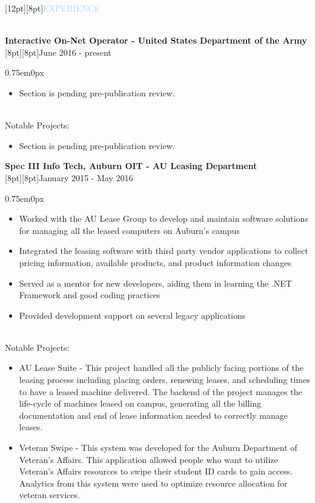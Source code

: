 \documentclass[12pt]{res}
\newenvironment{ResumeBlock}[1]
{
	\begin{large}
		\raisebox{0pt}[12pt][8pt]{\textcolor{lightblue}{#1}}
	\end{large}
	\\
}
{	
}
\newenvironment{DetailsBlock}[2]
{
	\textbf{\color{darkfont}#1}
	\\
	\raisebox{0pt}[8pt][8pt]{#2}
	\begin{adjustwidth}{0.75em}{0px}
}
{	
	\end{adjustwidth}
}
\begin{document}
	\begin{ResumeBlock}{EXPERIENCE}
		\begin{DetailsBlock}{Interactive On-Net Operator - United States Department of the Army}{June 2016 - present}
			\begin{itemize}
				\item Section is pending pre-publication review.
			\end{itemize}
			~\\
			Notable Projects:
			\begin{itemize}
				\item Section is pending pre-publication review.
			\end{itemize}
		\end{DetailsBlock}	
		\begin{DetailsBlock}{Spec III Info Tech, Auburn OIT - AU Leasing Department}{January 2015 - May 2016}
			\begin{itemize}
				\item Worked with the AU Lease Group to develop and maintain software solutions for managing all the leased computers on Auburn's campus
				\item Integrated the leasing software with third party vendor applications to collect pricing information, available products, and product information changes
                \item Served as a mentor for new developers, aiding them in learning the .NET Framework and good coding practices 
				\item Provided development support on several legacy applications
			\end{itemize}
			~\\
			Notable Projects:
			\begin{itemize}
				\item AU Lease Suite - This project handled all the publicly facing portions of the leasing process including placing orders, renewing leases, and scheduling times to have a leased machine delivered.  The backend of the project manages the life-cycle of machines leased on campus, generating all the billing documentation and end of lease information needed to correctly manage leases.    
                \item Veteran Swipe - This system was developed for the Auburn Department of Veteran's Affairs.  This application allowed people who want to utilize Veteran's Affairs resources to swipe their student ID cards to gain access.  Analytics from this system were used to optimize resource allocation for veteran services.

\end{itemize}
\end{DetailsBlock}
\end{ResumeBlock}
\end{document}
